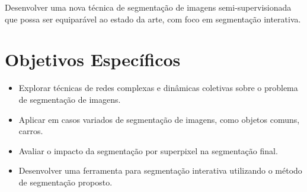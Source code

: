 Desenvolver uma nova técnica de segmentação de imagens
semi-supervisionada que possa ser equiparável ao estado da arte, com
foco em segmentação interativa.

\section{Objetivos Específicos}\label{sec:objetivo-geral}

\begin{itemize}
\item Explorar técnicas de redes complexas e dinâmicas coletivas sobre
  o problema de segmentação de imagens.
\item Aplicar em casos variados de segmentação de imagens, como
  objetos comuns, carros.
\item Avaliar o impacto da segmentação por superpixel na segmentação final.
\item Desenvolver uma ferramenta para segmentação interativa
  utilizando o método de segmentação proposto.
\end{itemize}



